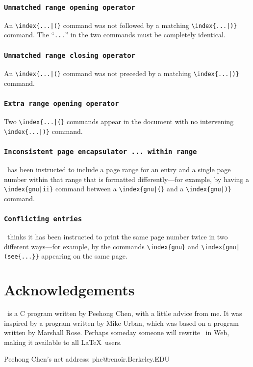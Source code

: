 \subsubsection*{\tt Unmatched range opening operator}

An \verb/\index{...|(}/ command was not followed by a matching
  \linebreak%
\verb/\index{...|)}/ command.  The ``\verb|...|'' in the two
commands must be completely identical.


\subsubsection*{\tt Unmatched range closing operator }

An \verb/\index{...|(}/ command was not preceded by a matching
  \linebreak%
\verb/\index{...|)}/ command. 

\subsubsection*{\tt Extra range opening operator }

Two \verb/\index{...|(}/ commands appear in the document with no intervening
\verb/\index{...|)}/ command.



\subsubsection*{\tt Inconsistent page encapsulator ... within range}

\MakeIndex\ has been instructed to include a page range for an entry
and a single page number within that range that is formatted
differently---for example, by having a 
\verb+\index{gnu|ii}+ command between a \verb+\index{gnu|(}+
and a \verb+\index{gnu|)}+ command.


\subsubsection*{\tt Conflicting entries}

\MakeIndex\ thinks it has been instructed to print the same page number
twice in two different ways---for example, by the commands
\verb|\index{gnu}| and \verb/\index{gnu|(see{...}}/ appearing on the
same page.



\section*{Acknowledgements}

\MakeIndex\ is a C program written by Peehong Chen, with a little
advice from me.  It was inspired by a program written by Mike Urban,
which was based on a program written by Marshall Rose.  Perhaps someday
someone will rewrite \MakeIndex\ in Web, making it available to all
\LaTeX\ users.



Peehong Chen's net address:
phc@renoir.Berkeley.EDU
